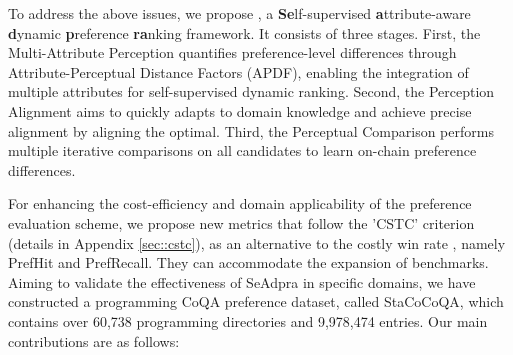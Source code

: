 To address the above issues, we propose \shortname, a \textbf{Se}lf-supervised \textbf{a}ttribute-aware \textbf{d}ynamic \textbf{p}reference \textbf{ra}nking framework. It consists of three stages.
First, the Multi-Attribute Perception quantifies preference-level differences through Attribute-Perceptual Distance Factors (APDF), enabling the integration of multiple attributes for self-supervised dynamic ranking.
Second, the Perception Alignment aims to quickly adapts to domain knowledge and achieve precise alignment by aligning the optimal.
Third, the Perceptual Comparison performs multiple iterative comparisons on all candidates to learn on-chain preference differences. 


For enhancing the cost-efficiency and domain applicability of the preference evaluation scheme, we propose new metrics that follow the 'CSTC' criterion (details in Appendix \ref{sec::cstc}), as an alternative to the costly win rate \cite{dudik2015contextual}, namely PrefHit and PrefRecall.
They can accommodate the expansion of benchmarks.
Aiming to validate the effectiveness of SeAdpra in specific domains, we have constructed a programming CoQA preference dataset, called StaCoCoQA, which contains over 60,738 programming directories and 9,978,474 entries. 
Our main contributions are as follows:

